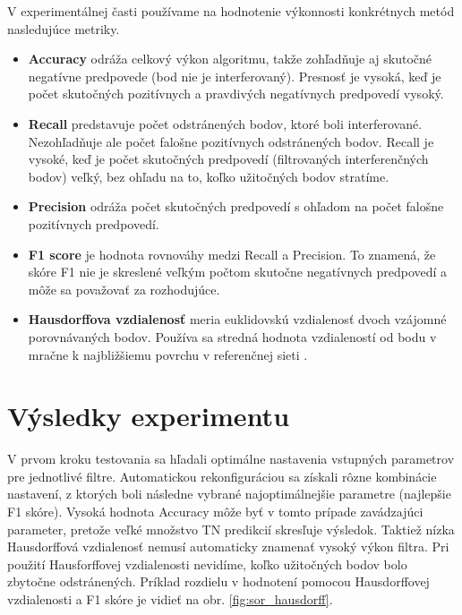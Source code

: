V experimentálnej časti používame na hodnotenie výkonnosti konkrétnych metód nasledujúce metriky.

\begin{itemize}
\item \textbf{Accuracy} odráža celkový výkon algoritmu, takže zohľadňuje aj skutočné negatívne predpovede (bod nie je interferovaný). Presnosť je vysoká, keď je počet skutočných pozitívnych a pravdivých negatívnych predpovedí vysoký.

\item \textbf{Recall} predstavuje počet odstránených bodov, ktoré boli interferované. Nezohľadňuje ale počet falošne pozitívnych odstránených bodov. Recall je vysoké, keď je počet skutočných predpovedí (filtrovaných interferenčných bodov) veľký, bez ohľadu na to, koľko užitočných bodov stratíme.

\item \textbf{Precision} odráža počet skutočných predpovedí s ohľadom na počet falošne pozitívnych predpovedí.

\item \textbf{F1 score} je hodnota rovnováhy medzi Recall a Precision. To znamená, že skóre F1 nie je skreslené veľkým počtom skutočne negatívnych predpovedí a môže sa považovať za rozhodujúce.

\item \textbf{Hausdorffova vzdialenosť} meria euklidovskú vzdialenosť dvoch vzájomné porovnávaných bodov. Používa sa stredná hodnota vzdialeností od bodu v mračne k najbližšiemu povrchu v referenčnej sieti .
\end{itemize}

\section{Výsledky experimentu}

V prvom kroku testovania sa hľadali optimálne nastavenia vstupných parametrov pre jednotlivé filtre. Automatickou rekonfiguráciou sa získali rôzne kombinácie nastavení, z ktorých boli následne vybrané najoptimálnejšie parametre (najlepšie F1 skóre). Vysoká hodnota Accuracy môže byť v tomto prípade zavádzajúci parameter, pretože veľké množstvo TN predikcií skresľuje výsledok. Taktiež nízka Hausdorffová vzdialenosť nemusí automaticky znamenať vysoký výkon filtra. Pri použití Hausforffovej vzdialenosti nevidíme, koľko užitočných bodov bolo zbytočne odstránených. Príklad rozdielu v hodnotení pomocou Hausdorffovej vzdialenosti a F1 skóre je vidieť na obr. \ref{fig:sor_hausdorff}. 


